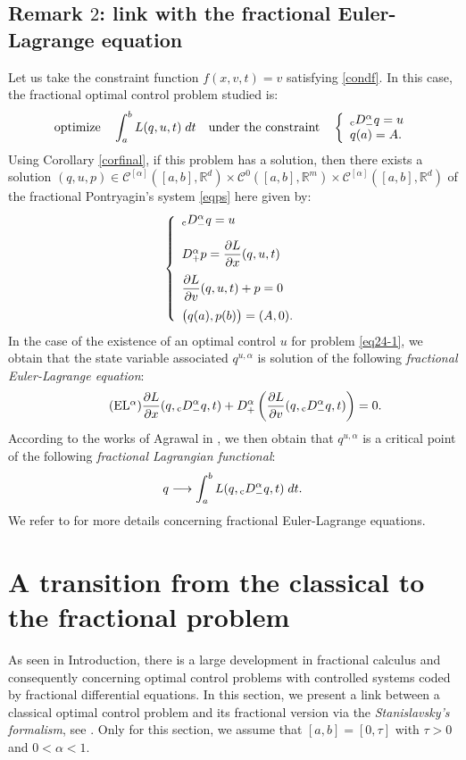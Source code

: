 \documentclass[english,11pt,reqno]{smfart}
\def\di{\displaystyle}
\newcommand{\R}{\mathbb{R}}
\newcommand{\CC}{\mathscr{C}}
\newcommand{\cDM}{{}_{{\rm c}} D^\alpha_-}
\newcommand{\DP}{D^\alpha_+}
\begin{document}
\subsection{Remark $2$: link with the fractional Euler-Lagrange equation}\label{section24} Let us take the constraint function $f(x,v,t) = v$ satisfying \eqref{condf}. In this case, the fractional optimal control problem studied is:
\begin{equation}\label{eq24-1}
\text{optimize} \quad \di \int_a^b L(q,u,t) \; dt \quad \text{under the constraint} \quad \left\lbrace \begin{array}{l}
 		\cDM q = u \\
 		q(a) = A.
        \end{array}
\right.
\end{equation}
Using Corollary \ref{corfinal}, if this problem has a solution, then there exists a solution $(q,u,p) \in \CC^{[\alpha]} ([a,b],\R^d) \times \CC^0 ([a,b],\R^m) \times \CC^{[\alpha]} ([a,b],\R^d)$ of the fractional Pontryagin's system \eqref{eqps} here given by:
\begin{equation}
 \left\lbrace \begin{array}{l}
 		\cDM q = u \\[10pt]
 		\DP p = \dfrac{\partial L}{\partial x} (q,u,t) \\[10pt]
	    \dfrac{\partial L}{\partial v} (q,u,t) + p = 0 \\[10pt]
	    \big( q(a),p(b) \big) = (A,0).
        \end{array}
\right.
\end{equation}
In the case of the existence of an optimal control $u$ for problem \eqref{eq24-1}, we obtain that the state variable associated $q^{u,\alpha}$ is solution of the following \textit{fractional Euler-Lagrange equation}:
\begin{equation}\tag{EL${}^\alpha$}
 \dfrac{\partial L}{\partial x} (q,\cDM q,t) + \DP \left(  \dfrac{\partial L}{\partial v} (q,\cDM q,t) \right) = 0.
\end{equation}
According to the works of Agrawal in \cite{agra}, we then obtain that $q^{u,\alpha}$ is a critical point of the following \textit{fractional Lagrangian functional}:
\begin{equation}
q \longrightarrow \di \int_a^b L(q,\cDM q,t) \; dt.
\end{equation}
We refer to \cite{agra} for more details concerning fractional Euler-Lagrange equations.



\section{A transition from the classical to the fractional problem}\label{section3}
As seen in Introduction, there is a large development in fractional calculus and consequently concerning optimal control problems with controlled systems coded by fractional differential equations. In this section, we present a link between a classical optimal control problem and its fractional version via the \textit{Stanislavsky's formalism}, see \cite{iniz,stan}. Only for this section, we assume that $[a,b]=[0,\tau] $ with $ \tau > 0 $  and $ 0 < \alpha < 1$. 
\end{document}
